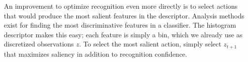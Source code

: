 \documentclass[letterpaper, 10 pt, conference]{ieeeconf}  %
\begin{document}
An improvement to optimize recognition even more directly is to select actions that would produce the most salient features in the descriptor.
Analysis methods exist for finding the most discriminative features in a classifier. The histogram descriptor makes this easy; each feature is simply a bin, which we already use as discretized observations $z$. To select the most salient action, simply select $z_{t+1}$ that maximizes saliency in addition to recognition confidence.






\end{document}
